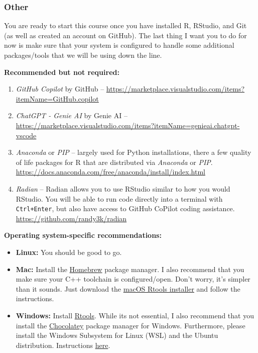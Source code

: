 \documentclass[11pt]{article}
\begin{document}
\subsubsection*{Other}

You are ready to start this course once you have installed R, RStudio, and Git (as well as created an account on GitHub). The last thing I want you to do for now is make sure that your system is configured to handle some additional packages/tools that we will be using down the line. 

\textbf{Recommended but not required:}
\begin{enumerate}
  \item \textit{GitHub Copilot} by GitHub -- \url{https://marketplace.visualstudio.com/items?itemName=GitHub.copilot}
  \item \textit{ChatGPT - Genie AI} by Genie AI -- \url{https://marketplace.visualstudio.com/items?itemName=genieai.chatgpt-vscode}
  \item \textit{Anaconda} or \textit{PIP} -- largely used for Python installations, there a few quality of life packages for R that are distributed via \textit{Anaconda} or \textit{PIP}. \url{https://docs.anaconda.com/free/anaconda/install/index.html}
  \item \textit{Radian} -- Radian allows you to use RStudio similar to how you would RStudio. You will be able to run code directly into a terminal with \texttt{Ctrl+Enter}, but also have access to GitHub CoPilot coding assistance. \url{https://github.com/randy3k/radian}
\end{enumerate}

\textbf{Operating system-specific recommendations:}

\begin{itemize}
	\item \textbf{Linux:} You should be good to go. 
	\item \textbf{Mac:} Install the \href{https://brew.sh/}{Homebrew} package manager. I also recommend that you make sure your C++ toolchain is configured/open. Don't worry, it's simpler than it sounds. Just download the \href{https://github.com/rmacoslib/r-macos-rtools#installer-package-for-macos-r-toolchain-}{macOS Rtools installer} and follow the instructions.
	\item \textbf{Windows:} Install \href{https://cran.r-project.org/bin/windows/Rtools/}{Rtools}. While its not essential, I also recommend that you install the \href{https://chocolatey.org/}{Chocolatey} package manager for Windows. Furthermore, please install the Windows Subsystem for Linux (WSL) and the Ubuntu distribution. Instructions \href{https://docs.microsoft.com/en-us/windows/wsl/install-win10}{here}.
\end{itemize}
\end{document}
